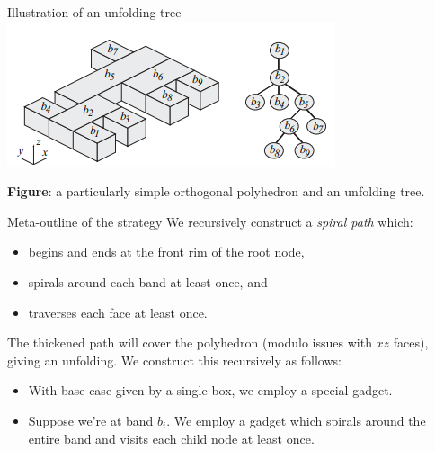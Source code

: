 \documentclass{beamer}
\theoremstyle{plain}
\begin{document}
  \begin{frame}{Illustration of an unfolding tree} 
    \includegraphics[width=\textwidth]{./figs/Unfolding_tree.png}
    \begin{center}
      \footnotesize \textbf{Figure}: a particularly simple orthogonal polyhedron and an unfolding tree. 
    \end{center}
  \end{frame}

  \begin{frame}{Meta-outline of the strategy}
    We recursively construct a \emph{spiral path} which:
    \begin{itemize}
      \item begins and ends at the front rim of the root node,
      \pause \item spirals around each band at least once, and
      \pause \item traverses each face at least once.
    \end{itemize}
    \pause The thickened path will cover the polyhedron (modulo issues with $xz$ faces), giving an unfolding.
    We construct this recursively as follows:
    \begin{itemize}
      \item With base case given by a single box, we employ a special gadget.
      \pause \item Suppose we're at band $b_i$.
        We employ a gadget which spirals around the entire band and visits each child node at least once.
    \end{itemize}
  \end{frame}
\end{document}

